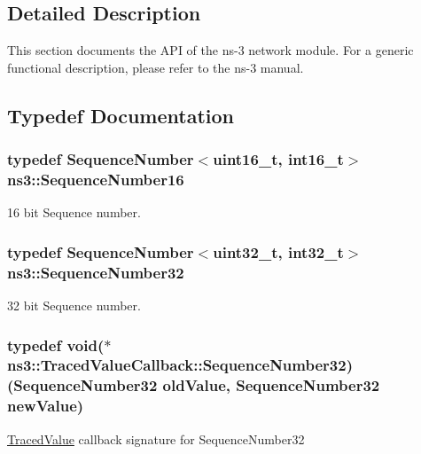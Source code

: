 \subsection{Detailed Description}
This section documents the A\+PI of the ns-\/3 network module. For a generic functional description, please refer to the ns-\/3 manual. 

\subsection{Typedef Documentation}
\subsubsection[{\texorpdfstring{Sequence\+Number16}{SequenceNumber16}}]{\setlength{\rightskip}{0pt plus 5cm}typedef Sequence\+Number$<$uint16\+\_\+t, int16\+\_\+t$>$ {\bf ns3\+::\+Sequence\+Number16}}\hypertarget{group__network_gaf266f5a4c5719a6897638f91ced3b5af}{}\label{group__network_gaf266f5a4c5719a6897638f91ced3b5af}
16 bit Sequence number. 
\subsubsection[{\texorpdfstring{Sequence\+Number32}{SequenceNumber32}}]{\setlength{\rightskip}{0pt plus 5cm}typedef Sequence\+Number$<$uint32\+\_\+t, int32\+\_\+t$>$ {\bf ns3\+::\+Sequence\+Number32}}\hypertarget{group__network_gacb2070e4e98d2d5135c9bede58f07a03}{}\label{group__network_gacb2070e4e98d2d5135c9bede58f07a03}
32 bit Sequence number. 
\subsubsection[{\texorpdfstring{Sequence\+Number32}{SequenceNumber32}}]{\setlength{\rightskip}{0pt plus 5cm}typedef void($\ast$  ns3\+::\+Traced\+Value\+Callback\+::\+Sequence\+Number32) (Sequence\+Number32 old\+Value, Sequence\+Number32 new\+Value)}\hypertarget{group__network_ga27972028fff053ee0921314701d0df61}{}\label{group__network_ga27972028fff053ee0921314701d0df61}
\hyperlink{classns3_1_1TracedValue}{Traced\+Value} callback signature for Sequence\+Number32


